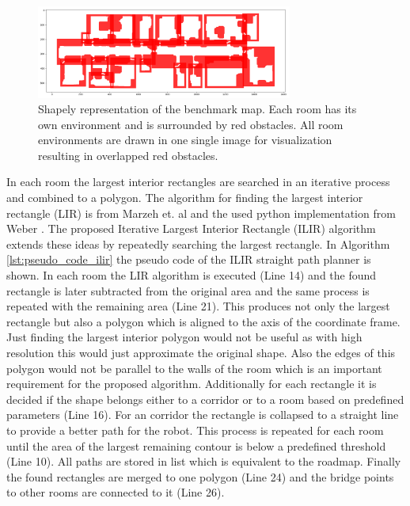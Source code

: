 \begin{figure}[h]
    \centering
    \includegraphics[width=0.75\textwidth]{figures/50_implementation/ruy_shapely.png}
    \caption[Shapely representation of the benchmark map]{Shapely representation of the benchmark map. Each room has its own environment and is surrounded by red obstacles. All room environments are drawn in one single image for visualization resulting in overlapped red obstacles.}
    \label{fig:ryu_shapely}
\end{figure}

In each room the largest interior rectangles are searched in an iterative process and combined to a polygon. The algorithm for finding the largest interior rectangle (LIR) is from Marzeh et. al \cite{marzeh_algorithm_2019} and the used python implementation from Weber \cite{weber_largest_2023}. The proposed Iterative Largest Interior Rectangle (ILIR) algorithm extends these ideas by repeatedly searching the largest rectangle. In Algorithm \ref{lst:pseudo_code_ilir} the pseudo code of the ILIR straight path planner is shown. In each room the LIR algorithm is executed (Line 14) and the found rectangle is later subtracted from the original area and the same process is repeated with the remaining area (Line 21). This produces not only the largest rectangle but also a polygon which is aligned to the axis of the coordinate frame. Just finding the largest interior polygon would not be useful as with high resolution this would just approximate the original shape. Also the edges of this polygon would not be parallel to the walls of the room which is an important requirement for the proposed algorithm. Additionally for each rectangle it is decided if the shape belongs either to a corridor or to a room based on predefined parameters (Line 16). For an corridor the rectangle is collapsed to a straight line to provide a better path for the robot. This process is repeated for each room until the area of the largest remaining contour is below a predefined threshold (Line 10). All paths are stored in list which is equivalent to the roadmap. Finally the found rectangles are merged to one polygon (Line 24) and the bridge points to other rooms are connected to it (Line 26).

